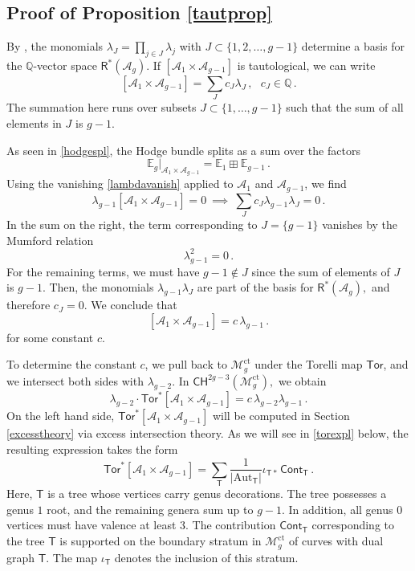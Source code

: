 \documentclass[11pt]{amsart}
\theoremstyle{definition}
\newcommand{\R}{\mathsf{R}}
\newcommand{\M}{\mathcal{M}}
\newcommand{\A}{\mathcal{A}}
\newcommand{\CH}{\mathsf{CH}}
\DeclareMathOperator{\ct}{ct}
\newcommand{\Tor}{\mathsf{Tor}}
\begin{document}
{\subsection{Proof of Proposition \ref{tautprop}} By  \cite {vdg}, the monomials $\lambda_J=\prod_{j\in J} \lambda_j$ with $J\subset \{1, 2, \ldots, g-1\}$ determine a basis for the $\mathbb Q$-vector space $\R^*(\mathcal A_g)$. 
If $[\A_1\times \A_{g-1}]$ is tautological, we can write
    \[
    [\A_1\times \A_{g-1}]=\sum_{J} c_J \lambda_J\, , \ \ \ c_J \in \mathbb{Q}\, .
    \]
    The summation here runs over subsets $J\subset \{1,\dots,g-1\}$ such that the sum of all elements in $J$ is $g-1$.
    
    As seen in \eqref{hodgespl}, the Hodge bundle splits as a sum over the factors $$\mathbb E_{g}\bigg|_{\mathcal A_1\times \mathcal A_{g-1}}=\mathbb E_1\boxplus \mathbb E_{g-1}\,.$$ Using the vanishing \eqref{lambdavanish} applied to $\A_1$ and $\A_{g-1}$, we find 
    \[
    \lambda_{g-1}[\A_1\times \A_{g-1}]=0\ \implies\ \sum_{J} c_J \lambda_{g-1}\lambda_J = 0\,.
    \]
In the sum on the right, the term corresponding to $J=\{g-1\}$ vanishes by the Mumford relation $$\lambda_{g-1}^2=0\,.$$ For the remaining terms, we must have $g-1\not \in J$ since the sum of elements of $J$ is $g-1$. Then, the monomials $\lambda_{g-1}\lambda_J$ are part of the basis for $\R^*(\mathcal A_g),$ and therefore $c_J=0$. We conclude that 
 \[
    [\A_1\times \A_{g-1}]=c\, \lambda_{g-1}\,.
    \]
for some constant $c.$ 

    To determine the constant $c$, we pull back to $\M_g^{\ct}$ under the Torelli map $\Tor$, and we intersect both sides with $\lambda_{g-2}$. In $\CH^{2g-3}(\M_g^{\ct}),$ we obtain
    \[
    \lambda_{g-2}\cdot \Tor^*[\A_1\times \A_{g-1}]=c\,\lambda_{g-2}\lambda_{g-1}\,.
    \] On the left hand side, $\Tor^*[\A_1\times \A_{g-1}]$ will be computed in Section \ref{excesstheory} via excess intersection theory. As we will see in \eqref{torexpl} below, the resulting expression takes the form $$\Tor^*[\A_1\times \A_{g-1}]=\sum_{\mathsf T}\frac{1}{|\mathrm{Aut}_{\mathsf T}|}\iota_{\mathsf T*\,}\textsf{Cont}_{\mathsf T}\,.$$ 
Here, $\mathsf T$ is a tree whose vertices carry genus decorations. The tree possesses a genus $1$ root, and the remaining genera sum up to $g-1$. In addition, all genus $0$ vertices must have valence at least $3$. The contribution $\mathsf{Cont}_\mathsf{T}$ corresponding to the tree $\mathsf T$ is supported on the boundary stratum in $\M_g^{\ct}$ of curves with dual graph $\mathsf T$. The map $\iota_{\mathsf T}$ denotes the inclusion of this stratum. 

}
\end{document}
